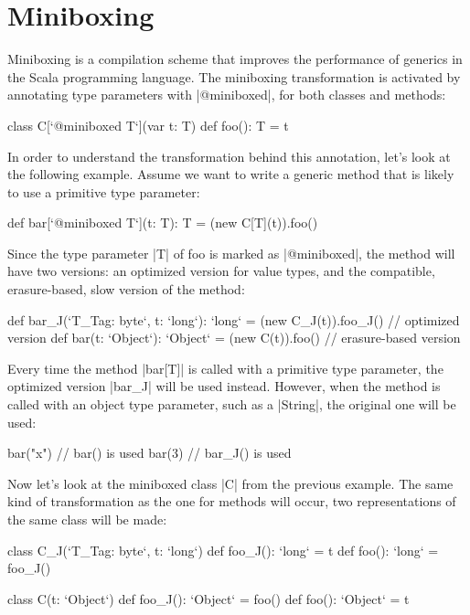 \section{Miniboxing}

Miniboxing\cite{miniboxing-www} is a compilation scheme that improves the performance of generics in the Scala programming language. The miniboxing transformation is activated by annotating type parameters with |@miniboxed|, for both classes and methods:

\begin{lstlisting-nobreak}
class C[`@miniboxed T`](var t: T) {
  def foo(): T = t
}
\end{lstlisting-nobreak}

In order to understand the transformation behind this annotation, let's look at the following example. Assume we want to write a generic method that is likely to use a primitive type parameter:

\begin{lstlisting-nobreak}
def bar[`@miniboxed T`](t: T): T =
  (new C[T](t)).foo()
\end{lstlisting-nobreak}

Since the type parameter |T| of foo is marked as |@miniboxed|, the method will have two versions: an optimized version for value types, and the compatible, erasure-based, slow version of the method:

\begin{lstlisting-nobreak}
def bar_J(`T_Tag: byte`, t: `long`): `long` =
  (new C_J(t)).foo_J()   // optimized version
def bar(t: `Object`): `Object` =
  (new C(t)).foo()   // erasure-based version
\end{lstlisting-nobreak}

Every time the method |bar[T]| is called with a primitive type parameter, the optimized version |bar_J| will be used instead. However, when the method is called with an object type parameter, such as a |String|, the original one will be used:

\begin{lstlisting-nobreak}
bar("x")  // bar() is used
bar(3)      // bar_J() is used
\end{lstlisting-nobreak}

Now let's look at the miniboxed class |C| from the previous example. The same kind of transformation as the one for methods will occur, two representations of the same class will be made:

\begin{lstlisting-nobreak}
class C_J(`T_Tag: byte`, t: `long`) {
  def foo_J(): `long` = t
  def foo(): `long` = foo_J()
}

class C(t: `Object`) {
  def foo_J(): `Object` = foo()
  def foo(): `Object` = t
}
\end{lstlisting-nobreak}

